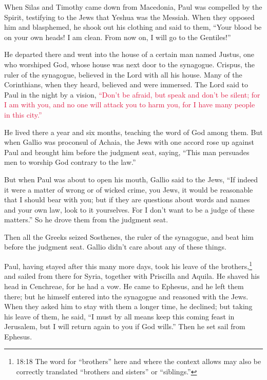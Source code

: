 \myverse{}When Silas and Timothy came down from Macedonia, Paul was compelled
by the Spirit, testifying to the Jews that Yeshua was the Messiah.
\myverse{}When they opposed him and blasphemed, he shook out his clothing and said to
them, “Your blood be on your own heads! I am clean. From now on, I will go to the Gentiles!”

\myverse{}He departed there and went into the house of a certain man named
Justus, one who worshiped God, whose house was next door to the synagogue.
\myverse{}Crispus, the ruler of the synagogue, believed in the Lord with all his house.
Many of the Corinthians, when they heard, believed and were immersed.
\myverse{}The Lord said to Paul in the night by a vision,
\textcolor{crimson}{“Don’t be afraid, but speak and don’t be silent;
}
\myverse{}\textcolor{crimson}{for I am with you, and no one will attack you to harm you, for I have
	many people in this city.”}

\myverse{}He lived there a year and six months, teaching the word of God
among them.
\myverse{}But when Gallio was proconsul of Achaia, the Jews with one accord rose up
against Paul and brought him before the judgment seat,
\myverse{}saying, “This man persuades men to worship God contrary to the law.”

\myverse{}But when Paul was about to open his mouth, Gallio said to the Jews,
“If indeed it were a matter of wrong or of wicked crime, you Jews, it would be reasonable that I should
bear with you;
\myverse{}but if they are questions about words and names and your own law, look to
it yourselves. For I don’t want to be a judge of these matters.”
\myverse{}So he drove them from the judgment seat.

\myverse{}Then all the Greeks seized Sosthenes, the ruler of the synagogue,
and beat him before the judgment seat. Gallio didn’t care about any of these things.

\myverse{}Paul, having stayed after this many more days, took his leave
of the brothers,\footnote{18:18 The word for “brothers” here and where the context allows may also be correctly translated “brothers
	and sisters” or “siblings.”} and sailed from there for Syria, together with Priscilla and Aquila.
He shaved his head in Cenchreae, for he had a vow.
\myverse{}He came to Ephesus, and he left them there; but he himself entered into the
synagogue and reasoned with the Jews.
\myverse{}When they asked him to stay with them a longer time, he declined;
\myverse{}but taking his leave of them, he said, “I must by all means keep this coming
feast in Jerusalem, but I will return again to you if God wills.” Then he set sail from Ephesus.

